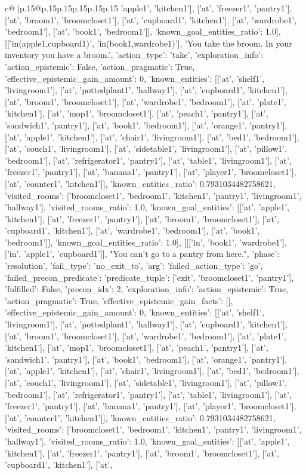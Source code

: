 \documentclass{article}
\begin{document}
{\begin{supertabular}{c@{$\;$}|p{.15\linewidth}@{}p{.15\linewidth}p{.15\linewidth}p{.15\linewidth}p{.15\linewidth}p{.15\linewidth}}
{{{'apple1', 'kitchen1'], ['at', 'freezer1', 'pantry1'], ['at', 'broom1', 'broomcloset1'], ['at', 'cupboard1', 'kitchen1'], ['at', 'wardrobe1', 'bedroom1'], ['at', 'book1', 'bedroom1']], 'known_goal_entities_ratio': 1.0}}], [['in(apple1,cupboard1)', 'in(book1,wardrobe1)'], 'You take the broom. In your inventory you have a broom.', {'action_type': 'take', 'exploration_info': {'action_epistemic': False, 'action_pragmatic': True, 'effective_epistemic_gain_amount': 0, 'known_entities': [['at', 'shelf1', 'livingroom1'], ['at', 'pottedplant1', 'hallway1'], ['at', 'cupboard1', 'kitchen1'], ['at', 'broom1', 'broomcloset1'], ['at', 'wardrobe1', 'bedroom1'], ['at', 'plate1', 'kitchen1'], ['at', 'mop1', 'broomcloset1'], ['at', 'peach1', 'pantry1'], ['at', 'sandwich1', 'pantry1'], ['at', 'book1', 'bedroom1'], ['at', 'orange1', 'pantry1'], ['at', 'apple1', 'kitchen1'], ['at', 'chair1', 'livingroom1'], ['at', 'bed1', 'bedroom1'], ['at', 'couch1', 'livingroom1'], ['at', 'sidetable1', 'livingroom1'], ['at', 'pillow1', 'bedroom1'], ['at', 'refrigerator1', 'pantry1'], ['at', 'table1', 'livingroom1'], ['at', 'freezer1', 'pantry1'], ['at', 'banana1', 'pantry1'], ['at', 'player1', 'broomcloset1'], ['at', 'counter1', 'kitchen1']], 'known_entities_ratio': 0.7931034482758621, 'visited_rooms': ['broomcloset1', 'bedroom1', 'kitchen1', 'pantry1', 'livingroom1', 'hallway1'], 'visited_rooms_ratio': 1.0, 'known_goal_entities': [['at', 'apple1', 'kitchen1'], ['at', 'freezer1', 'pantry1'], ['at', 'broom1', 'broomcloset1'], ['at', 'cupboard1', 'kitchen1'], ['at', 'wardrobe1', 'bedroom1'], ['at', 'book1', 'bedroom1']], 'known_goal_entities_ratio': 1.0}}], [[['in', 'book1', 'wardrobe1'], ['in', 'apple1', 'cupboard1']], "You can't go to a pantry from here.", {'phase': 'resolution', 'fail_type': 'no_exit_to', 'arg': {'failed_action_type': 'go', 'failed_precon_predicate': {'predicate_tuple': ['exit', 'broomcloset1', 'pantry1'], 'fulfilled': False, 'precon_idx': 2}}, 'exploration_info': {'action_epistemic': True, 'action_pragmatic': True, 'effective_epistemic_gain_facts': [], 'effective_epistemic_gain_amount': 0, 'known_entities': [['at', 'shelf1', 'livingroom1'], ['at', 'pottedplant1', 'hallway1'], ['at', 'cupboard1', 'kitchen1'], ['at', 'broom1', 'broomcloset1'], ['at', 'wardrobe1', 'bedroom1'], ['at', 'plate1', 'kitchen1'], ['at', 'mop1', 'broomcloset1'], ['at', 'peach1', 'pantry1'], ['at', 'sandwich1', 'pantry1'], ['at', 'book1', 'bedroom1'], ['at', 'orange1', 'pantry1'], ['at', 'apple1', 'kitchen1'], ['at', 'chair1', 'livingroom1'], ['at', 'bed1', 'bedroom1'], ['at', 'couch1', 'livingroom1'], ['at', 'sidetable1', 'livingroom1'], ['at', 'pillow1', 'bedroom1'], ['at', 'refrigerator1', 'pantry1'], ['at', 'table1', 'livingroom1'], ['at', 'freezer1', 'pantry1'], ['at', 'banana1', 'pantry1'], ['at', 'player1', 'broomcloset1'], ['at', 'counter1', 'kitchen1']], 'known_entities_ratio': 0.7931034482758621, 'visited_rooms': ['broomcloset1', 'bedroom1', 'kitchen1', 'pantry1', 'livingroom1', 'hallway1'], 'visited_rooms_ratio': 1.0, 'known_goal_entities': [['at', 'apple1', 'kitchen1'], ['at', 'freezer1', 'pantry1'], ['at', 'broom1', 'broomcloset1'], ['at', 'cupboard1', 'kitchen1'], ['at', }}}
\end{supertabular}}
\end{document}
